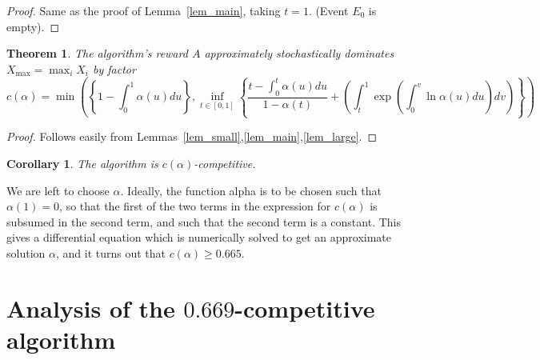 \documentclass[10pt, letterpaper, twoside]{article}
\newtheorem{theorem}{Theorem}
\newtheorem{corollary}{Corollary}
\begin{document}
\begin{proof}
Same as the proof of Lemma~\ref{lem_main}, taking $t=1$. (Event $E_0$ is empty).
\end{proof}

\begin{theorem}
The algorithm's reward $A$ approximately stochastically dominates $X_{\max}=\max_i X_i$ by factor
\[c(\alpha)=\min\left(\left\{1-\int_0^1\alpha(u)du\right\},\inf_{t\in[0,1]}\left\{\frac{t-\int_0^t\alpha(u)du}{1-\alpha(t)}+\left(\int_t^1\exp\left(\int_0^v\ln\alpha(u)du\right)dv\right)\right\}\right)\]
\end{theorem}

\begin{proof}
Follows easily from Lemmas~\ref{lem_small},\ref{lem_main},\ref{lem_large}.
\end{proof}

\begin{corollary}
The algorithm is $c(\alpha)$-competitive.
\end{corollary}

We are left to choose $\alpha$. Ideally, the function alpha is to be chosen such that $\alpha(1)=0$, so that the first of the two terms in the expression for $c(\alpha)$ is subsumed in the second term, and such that the second term is a constant. This gives a differential equation which is numerically solved to get an approximate solution $\alpha$, and it turns out that $c(\alpha)\geq0.665$.


\section{Analysis of the $0.669$-competitive algorithm}
\end{document}
